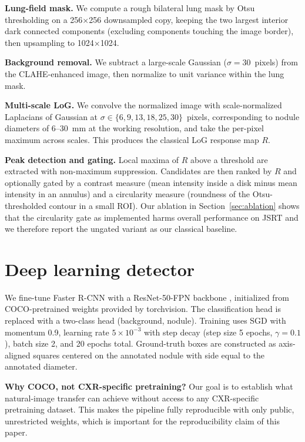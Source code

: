\documentclass[11pt]{article}
\begin{document}
\textbf{Lung-field mask.} We compute a rough bilateral lung mask by Otsu
thresholding on a 256$\times$256 downsampled copy, keeping the two largest
interior dark connected components (excluding components touching the image
border), then upsampling to 1024$\times$1024.

\textbf{Background removal.} We subtract a large-scale Gaussian
($\sigma = 30$~pixels) from the CLAHE-enhanced image, then normalize to
unit variance within the lung mask.

\textbf{Multi-scale LoG.} We convolve the normalized image with
scale-normalized Laplacians of Gaussian at $\sigma \in \{6, 9, 13, 18, 25,
30\}$~pixels, corresponding to nodule diameters of 6--30~mm at the working
resolution, and take the per-pixel maximum across scales. This produces the
classical LoG response map $R$.

\textbf{Peak detection and gating.} Local maxima of $R$ above a threshold
are extracted with non-maximum suppression. Candidates are then ranked by
$R$ and optionally gated by a contrast measure (mean intensity inside a
disk minus mean intensity in an annulus) and a circularity measure
(roundness of the Otsu-thresholded contour in a small ROI). Our ablation
in Section~\ref{sec:ablation} shows that the circularity gate as
implemented harms overall performance on JSRT and we therefore report
the ungated variant as our classical baseline.

\section{Deep learning detector}
\label{sec:dl}

We fine-tune Faster R-CNN with a ResNet-50-FPN backbone
\cite{ren2015faster}, initialized from COCO-pretrained weights provided by
torchvision. The classification head is replaced with a two-class head
(background, nodule). Training uses SGD with momentum 0.9, learning rate
$5 \times 10^{-3}$ with step decay (step size 5 epochs, $\gamma = 0.1$),
batch size 2, and 20 epochs total. Ground-truth boxes are constructed as
axis-aligned squares centered on the annotated nodule with side equal to
the annotated diameter.

\textbf{Why COCO, not CXR-specific pretraining?} Our goal is to establish
what natural-image transfer can achieve without access to any CXR-specific
pretraining dataset. This makes the pipeline fully reproducible with only
public, unrestricted weights, which is important for the reproducibility
claim of this paper.
\end{document}
